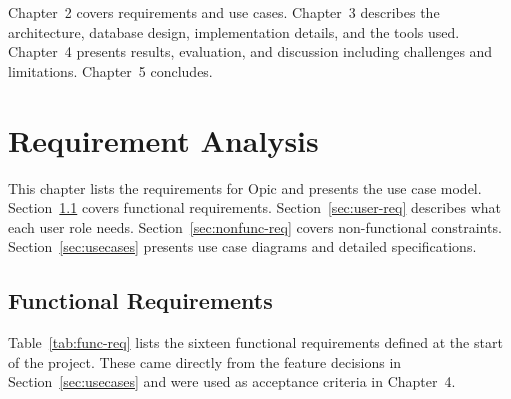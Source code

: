 \documentclass[12pt,a4paper]{report}
\begin{document}
Chapter~2 covers requirements and use cases. Chapter~3 describes the architecture, database design, implementation details, and the tools used. Chapter~4 presents results, evaluation, and discussion including challenges and limitations. Chapter~5 concludes.

\newpage

\chapter{Requirement Analysis}

This chapter lists the requirements for Opic and presents the use case model. Section~\ref{sec:func-req} covers functional requirements. Section~\ref{sec:user-req} describes what each user role needs. Section~\ref{sec:nonfunc-req} covers non-functional constraints. Section~\ref{sec:usecases} presents use case diagrams and detailed specifications.

\section{Functional Requirements}
\label{sec:func-req}

Table~\ref{tab:func-req} lists the sixteen functional requirements defined at the start of the project. These came directly from the feature decisions in Section~\ref{sec:usecases} and were used as acceptance criteria in Chapter~4.
\end{document}
